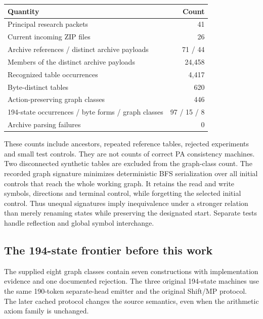 \begin{center}
\begin{tabular}{@{}lr@{}}
\toprule
Quantity & Count\\\midrule
Principal research packets & 41\\
Current incoming ZIP files & 26\\
Archive references / distinct archive payloads & 71 / 44\\
Members of the distinct archive payloads & 24,458\\
Recognized table occurrences & 4,417\\
Byte-distinct tables & 620\\
Action-preserving graph classes & 446\\
194-state occurrences / byte forms / graph classes & 97 / 15 / 8\\
Archive parsing failures & 0\\\bottomrule
\end{tabular}
\end{center}
These counts include ancestors, repeated reference tables, rejected
experiments and small test controls. They are not counts of correct PA
consistency machines. Two disconnected synthetic tables are excluded from
the graph-class count. The recorded graph signature minimizes deterministic
BFS serialization over all initial controls that reach the whole working
graph. It retains the read and write symbols, directions and terminal
control, while forgetting the selected initial control. Thus unequal
signatures imply inequivalence under a stronger relation than merely
renaming states while preserving the designated start. Separate tests
handle reflection and global symbol interchange.

\subsection{The 194-state frontier before this work}
The supplied eight graph classes contain seven constructions with
implementation evidence and one documented rejection. The three original
194-state machines use the same 190-token separate-head emitter and the
original Shift/MP protocol. The later cached protocol changes the source
semantics, even when the arithmetic axiom family is unchanged.

